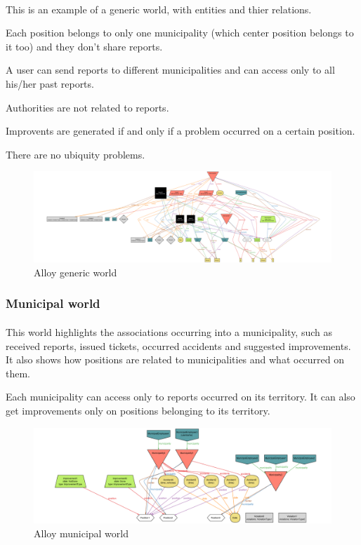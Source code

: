 				\paragraph{}
					This is an example of a generic world, with entities and thier relations.
					
					Each position belongs to only one municipality (which center position belongs to it too) and they don't share reports. 
					
					A user can send reports to different municipalities and can access only to all his/her past reports.
					
					Authorities are not related to reports.
					
					Improvents are generated if and only if a problem occurred on a certain position.
					
					There are no ubiquity problems.
					\begin{figure}[!h]
						\includegraphics[width=\textwidth]{images/Alloy/GenericWorld.png}
						\caption{Alloy generic world}
					\end{figure}
			\subsubsection{Municipal world}
				\paragraph{}
					This world highlights the associations occurring into a municipality, such as received reports, issued tickets, occurred accidents and suggested improvements. It also shows how positions are related to municipalities and what occurred on them.
					
					Each municipality can access only to reports occurred on its territory. It can also get improvements only on positions belonging to its territory.
					\begin{figure}[!h]
						\includegraphics[width=\textwidth]{images/Alloy/MunicipalWorld.png}
						\caption{Alloy municipal world}
					\end{figure}
			\clearpage
